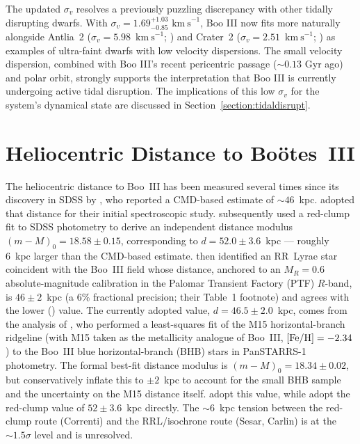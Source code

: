 \documentclass[twocolumn]{aastex631}
\newcommand{\vlosUnits}{$\mathrm{km~s}^{-1}$\xspace}
\begin{document}
The updated $\sigma_v$ resolves a previously puzzling discrepancy with other tidally disrupting dwarfs. With $\sigma_{v} = 1.69^{+1.03}_{-0.85}$ \vlosUnits, Boo III now fits more naturally alongside Antlia~2 ($\sigma_v = 5.98$~\vlosUnits; \citealt{Ji2021}) and Crater~2 ($\sigma_v = 2.51$~\vlosUnits; \citealt{Limberg2025}) as examples of ultra-faint dwarfs with low velocity dispersions. The small velocity dispersion, combined with Boo III's recent pericentric passage ($\sim 0.13$ Gyr ago) and polar orbit, strongly supports the interpretation that Boo III is currently undergoing active tidal disruption. The implications of this low $\sigma_v$ for the system's dynamical state are discussed in Section~\ref{section:tidaldisrupt}.


\section{Heliocentric Distance to Boötes~III} \label{section:distance}

The heliocentric distance to Boo~III has been measured several times since its discovery in SDSS by \citet{Grillmair2009}, who reported a CMD-based estimate of $\sim 46$~kpc. \citet{Carlin2009} adopted that distance for their initial spectroscopic study. \citet{Correnti2009} subsequently used a red-clump fit to SDSS photometry to derive an independent distance modulus $(m-M)_0 = 18.58 \pm 0.15$, corresponding to $d = 52.0 \pm 3.6$~kpc --- roughly 6~kpc larger than the CMD-based estimate. \citet{Sesar2014} then identified an RR~Lyrae star coincident with the Boo~III field whose distance, anchored to an $M_R = 0.6$ absolute-magnitude calibration in the Palomar Transient Factory (PTF) $R$-band, is $46 \pm 2$~kpc (a 6\% fractional precision; their Table~1 footnote) and agrees with the lower (\citealt{Grillmair2009}) value. The currently adopted value, $d = 46.5 \pm 2.0$~kpc, comes from the analysis of \citet{Carlin2018}, who performed a least-squares fit of the M15 horizontal-branch ridgeline (with M15 taken as the metallicity analogue of Boo~III, $[{\rm Fe/H}] = -2.34$) to the Boo~III blue horizontal-branch (BHB) stars in PanSTARRS-1 photometry. The formal best-fit distance modulus is $(m-M)_0 = 18.34 \pm 0.02$, but \citet{Carlin2018} conservatively inflate this to $\pm 2$~kpc to account for the small BHB sample and the uncertainty on the M15 distance itself. \citet{Pace2022} adopt this value, while \citet{Moskowitz2020} adopt the \citet{Correnti2009} red-clump value of $52 \pm 3.6$~kpc directly. The $\sim 6$~kpc tension between the red-clump route (Correnti) and the RRL/isochrone route (Sesar, Carlin) is at the $\sim 1.5\sigma$ level and is unresolved.
\end{document}
